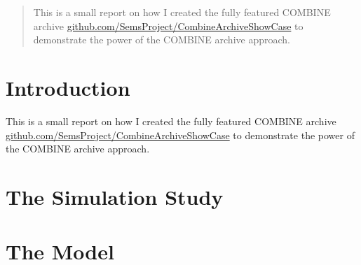 \documentclass[a4paper,10pt]{scrartcl}
\begin{document}
\maketitle
% 

\begin{abstract}
This is a small report on how I created the fully featured COMBINE archive
\href{https://github.com/SemsProject/CombineArchiveShowCase}{github.com/SemsProject/CombineArchiveShowCase}
to demonstrate the power of the COMBINE archive approach.
\end{abstract}

\section{Introduction}
This is a small report on how I created the fully featured COMBINE archive
\href{https://github.com/SemsProject/CombineArchiveShowCase}{github.com/SemsProject/CombineArchiveShowCase}
to demonstrate the power of the COMBINE archive approach.

\section{The Simulation Study}

\section{The Model}
\end{document}
